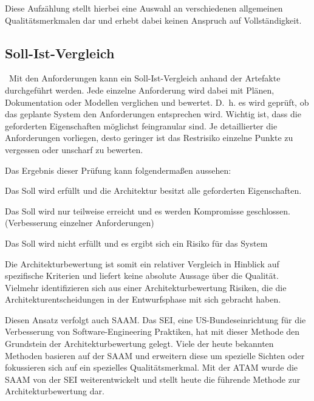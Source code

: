 Diese Aufzählung stellt hierbei eine Auswahl an verschiedenen allgemeinen Qualitätsmerkmalen dar und erhebt dabei keinen Anspruch auf Vollständigkeit.

\subsection{Soll-Ist-Vergleich}
\
Mit den Anforderungen kann ein Soll-Ist-Vergleich anhand der Artefakte durchgeführt werden. Jede einzelne Anforderung wird dabei mit Plänen, Dokumentation oder Modellen verglichen und bewertet. D.~h. es wird geprüft, ob das geplante System den Anforderungen entsprechen wird. Wichtig ist, dass die geforderten Eigenschaften möglichst feingranular sind. Je detaillierter die Anforderungen vorliegen, desto geringer ist das Restrisiko einzelne Punkte zu vergessen oder unscharf zu bewerten.
  
Das Ergebnis dieser Prüfung kann folgendermaßen aussehen\cite{Starke2015}:

\begin{description}[leftmargin=!,labelwidth=\widthof{\bfseries Soll $=$ Is}]
	\item[Soll $=$ Ist] 
	Das Soll wird erfüllt und die Architektur besitzt alle geforderten Eigenschaften.
	\item[Soll $\approx$ Ist] 
	Das Soll wird nur teilweise erreicht und es werden Kompromisse geschlossen. (Verbesserung einzelner Anforderungen)
	\item[Soll $\neq$ Ist] 
	Das Soll wird nicht erfüllt und es ergibt sich ein Risiko für das System
\end{description}

Die Architekturbewertung ist somit ein relativer Vergleich in Hinblick auf spezifische 
Kriterien und liefert keine absolute Aussage über die Qualität. Vielmehr identifizieren sich aus einer Architekturbewertung Risiken, die die Architekturentscheidungen in der Entwurfsphase mit sich gebracht haben. 

Diesen Ansatz verfolgt auch \ac{SAAM}. Das \ac{SEI}, eine US-Bundeseinrichtung für die Verbesserung von Software-Engineering Praktiken, hat mit dieser Methode den Grundstein der Architekturbewertung gelegt.
Viele der heute bekannten 
Methoden basieren auf der \ac{SAAM} und erweitern diese um spezielle Sichten oder fokussieren sich auf ein spezielles Qualitätsmerkmal. Mit der \ac{ATAM} wurde die \ac{SAAM} von der \ac{SEI} weiterentwickelt und stellt heute die führende Methode zur Architekturbewertung dar\cite{ATAM_SEI}.

